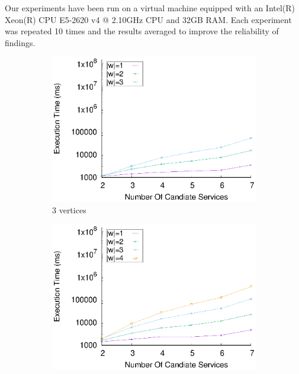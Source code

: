     Our experiments have been run on a virtual machine equipped with an Intel(R) Xeon(R) CPU E5-2620 v4 @ 2.10GHz CPU and 32GB RAM. Each experiment was repeated 10 times and the results averaged to improve the reliability of findings.

    \begin{figure}[!ht]
      \centering
      \begin{subfigure}{0.45\textwidth}
        \includegraphics[width=\textwidth]{Images/graphs/window_time_performance_qualitative_n7_s7_50_80_n3}
        \caption{3 vertices}
        \label{fig:time_window_perce_wide_3n}
      \end{subfigure}
      \hfill
      \begin{subfigure}{0.45\textwidth}
        \includegraphics[width=\textwidth]{Images/graphs/window_time_performance_qualitative_n7_s7_50_80_n4}

\end{subfigure}
\end{figure}
